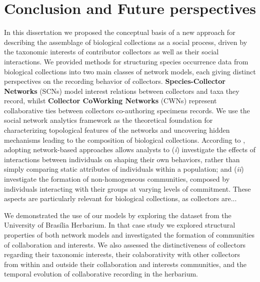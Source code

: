\chapter{Conclusion and Future perspectives}\label{conclusion_perspectives}


In this dissertation we proposed the conceptual basis of a new approach for describing the assemblage of biological collections as a social process, driven by the taxonomic interests of contributor collectors as well as their social interactions.
We provided methods for structuring species occurrence data from biological collections into two main classes of network models, each giving distinct perspectives on the recording behavior of collectors.
\textbf{Species-Collector Networks} (SCNs) model interest relations between collectors and taxa they record, whilst \textbf{Collector CoWorking Networks} (CWNs) represent collaborative ties between collectors co-authoring specimens records. 
We use the social network analytics framework \cite{Barbier2011, Stork2015} as the theoretical foundation for characterizing topological features of the networks and uncovering hidden mechanisms leading to the composition of biological collections.
%
According to \cite{Marin2011}, adopting network-based approaches allows analysts to
(\textit{i}) investigate the effects of interactions between individuals on shaping their own behaviors, rather than simply comparing static attributes of individuals within a population; and
(\textit{ii}) investigate the formation of non-homogeneous communities, composed by individuals interacting with their groups at varying levels of commitment.
These aspects are particularly relevant for biological collections, as collectors are...

We demonstrated the use of our models by exploring the dataset from the University of Brasília Herbarium.
In that case study we explored structural properties of both network models and investigated the formation of communities of collaboration and interests.
We also assessed the distinctiveness of collectors regarding their taxonomic interests, their colaborativity with other collectors from within and outside their collaboration and interests communities, and the temporal evolution of collaborative recording in the herbarium.


